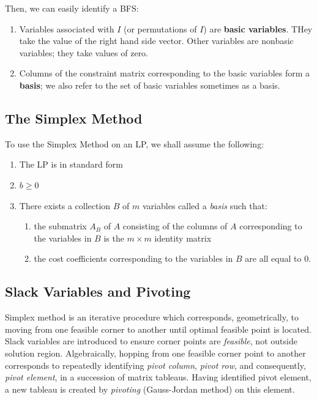 \documentclass{article}
\begin{document}
\noindent Then, we can easily identify a BFS:

\begin{enumerate}
    \item Variables associated with $I$ (or permutations of $I$) are \textbf{basic variables}. THey take the value of the right hand side vector. Other variables are nonbasic variables; they take values of zero. 
    \item Columns of the constraint matrix corresponding to the basic variables form a \textbf{basis}; we also refer to the set of basic variables sometimes as a basis. 
\end{enumerate}

\subsection{The Simplex Method}
To use the Simplex Method on an LP, we shall assume the following:

\begin{enumerate}
    \item The LP is in standard form
    \item $b \geq 0$
    \item There exists a collection $B$ of $m$ variables called a \textit{basis} such that: \begin{enumerate}
        \item the submatrix $A_B$ of $A$ consisting of the columns of $A$ corresponding to the variables in $B$ is the $m \times m$ identity matrix
        \item the cost coefficients corresponding to the variables in $B$ are all equal to 0. 
    \end{enumerate}
\end{enumerate}


\subsection{Slack Variables and Pivoting}

Simplex method is an iterative procedure which corresponds, geometrically, to moving from one feasible corner to another until optimal feasible point is located. Slack variables are introduced to ensure corner points are \textit{feasible}, not outside solution region. Algebraically, hopping from one feasible corner point to another corresponds to repeatedly identifying \textit{pivot column}, \textit{pivot row}, and consequently, \textit{pivot element}, in a succession of matrix tableaus. Having identified pivot element, a new tableau is created by \textit{pivoting} (Gauss-Jordan method) on this element. 
\end{document}
